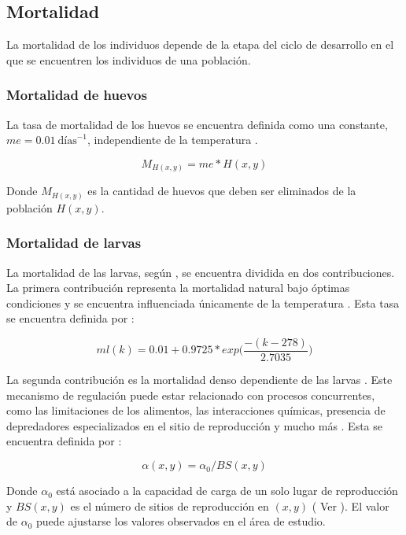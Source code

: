 
\subsection{Mortalidad}
\label{subsec:cap4-mortalidad}
La mortalidad de los individuos depende de la etapa del ciclo de desarrollo en el que se encuentren
los individuos de una población.

\subsubsection{Mortalidad de huevos}
La tasa de mortalidad de los huevos se encuentra definida como una constante,
$me = 0.01\ \text{días}^{-1}$, independiente de la temperatura \cite{otero2006stochastic}.

\begin{equation}
    M_{H(x,y)} = me * H(x,y)
\end{equation}

Donde $M_{H(x,y)}$ es la cantidad de huevos que deben ser eliminados de la población $H(x,y)$.

\subsubsection{Mortalidad de larvas}
La mortalidad de las larvas, según \cite{otero2006stochastic}, se encuentra dividida en dos
contribuciones. La primera contribución representa la mortalidad natural bajo óptimas condiciones
y se encuentra influenciada únicamente de la temperatura \cite{otero2006stochastic}. Esta tasa se
encuentra definida por :

\begin{equation}
\label{eq:mortalidad-natural-larvas}
    ml(k) = 0.01 + 0.9725 * exp\bigg( \frac{-(k - 278)}{2.7035}\bigg)
\end{equation}

La segunda contribución es la mortalidad denso dependiente de las larvas \cite{otero2006stochastic}
. Este mecanismo de regulación puede estar relacionado con procesos concurrentes, como las
limitaciones de los alimentos, las interacciones químicas, presencia de depredadores
especializados en el sitio de reproducción y mucho más \cite{otero2006stochastic}. Esta se
encuentra definida por :

\begin{equation}
  \alpha (x,y) = \alpha _{0}/BS(x,y)
\end{equation}

Donde $\alpha _{0}$ está asociado a la capacidad de carga de un solo lugar de reproducción y
$BS(x,y)$ es el número de sitios de reproducción en $(x,y)$ ( Ver
). El valor de $\alpha _{0}$ puede
ajustarse los valores observados en el área de estudio.

